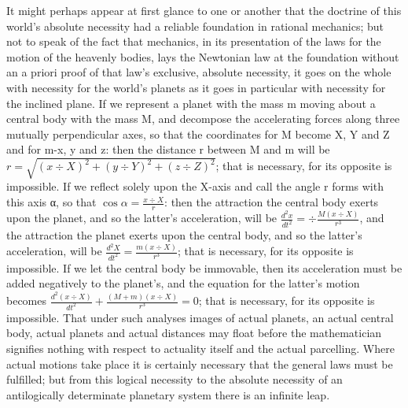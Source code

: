 \documentclass[12pt,a4paper]{book}
\begin{document}
It might perhaps appear at first glance to one or another that the doctrine of this world's
absolute necessity had a reliable foundation in rational mechanics; but not to speak of the fact
that mechanics, in its presentation of the laws for the motion of the heavenly bodies, lays the
Newtonian law at the foundation without an a priori proof of that law's exclusive, absolute
necessity, it goes on the whole with necessity for the world's planets as it goes in particular
with necessity for the inclined plane. If we represent a planet with the mass m moving about a
central body with the mass M, and decompose the accelerating forces along three mutually
perpendicular axes, so that
the coordinates for M become X, Y and Z and for m-x, y and z: then the distance r between M and m
will be
$r = \sqrt{(x \div X)^{2} + (y \div Y)^{2} + (z \div Z)^{2}}$; that is necessary, for its opposite
is impossible. If we reflect solely upon
the X-axis and call the angle r forms with this axis α, so that $\cos\alpha = \frac{x \div X}{r}$:
then the attraction the central body exerts upon the planet, and so the latter's acceleration,
will be
$\frac{d^{2}x}{dt^{2}} = \div\frac{M(x \div X)}{r^{3}}$, and the attraction the planet exerts upon
the central body, and so the latter's acceleration, will be
$\frac{d^{2}X}{dt^{2}} = \frac{m(x \div X)}{r^{3}}$; that is necessary, for its opposite is
impossible. If we let the central body be immovable, then its acceleration must be added
negatively to the planet's, and the equation for the latter's motion becomes
$\frac{d^{2}(x \div X)}{dt^{2}} + \frac{(M + m)(x \div X)}{r^{3}} = 0$; that is necessary, for its
opposite is impossible. That under such analyses images of actual planets, an actual central body,
actual planets and actual distances may float before the mathematician signifies nothing with
respect to actuality itself and the actual parcelling. Where actual motions take place it is
certainly necessary that the general laws must be fulfilled; but from this logical necessity to
the absolute necessity of an antilogically determinate planetary system there is an infinite leap.
\end{document}
